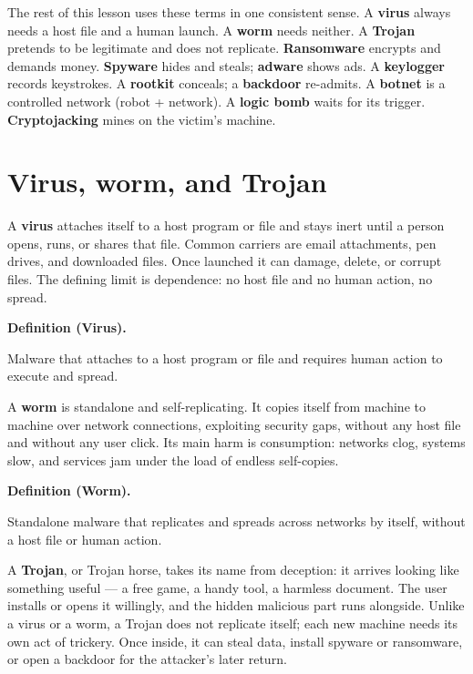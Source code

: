 \documentclass[11pt]{article}
\newenvironment{definitionbox}[1]{%
  \par\noindent\textbf{Definition (#1).}\ \itshape
}{\par\vspace{0.3em}}
\begin{document}
The rest of this lesson uses these terms in one consistent sense. A
\textbf{virus} always needs a host file and a human launch. A \textbf{worm}
needs neither. A \textbf{Trojan} pretends to be legitimate and does not
replicate. \textbf{Ransomware} encrypts and demands money.
\textbf{Spyware} hides and steals; \textbf{adware} shows ads. A
\textbf{keylogger} records keystrokes. A \textbf{rootkit} conceals; a
\textbf{backdoor} re-admits. A \textbf{botnet} is a controlled network (robot
+ network). A \textbf{logic bomb} waits for its trigger.
\textbf{Cryptojacking} mines on the victim's machine.

\section{Virus, worm, and Trojan}
A \textbf{virus} attaches itself to a host program or file and stays inert
until a person opens, runs, or shares that file. Common carriers are email
attachments, pen drives, and downloaded files. Once launched it can damage,
delete, or corrupt files. The defining limit is dependence: no host file
and no human action, no spread.

\begin{definitionbox}{Virus}
Malware that attaches to a host program or file and requires human action
to execute and spread.
\end{definitionbox}

A \textbf{worm} is standalone and self-replicating. It copies itself from
machine to machine over network connections, exploiting security gaps,
without any host file and without any user click. Its main harm is
consumption: networks clog, systems slow, and services jam under the load
of endless self-copies.

\begin{definitionbox}{Worm}
Standalone malware that replicates and spreads across networks by itself,
without a host file or human action.
\end{definitionbox}

A \textbf{Trojan}, or Trojan horse, takes its name from deception: it
arrives looking like something useful --- a free game, a handy tool, a
harmless document. The user installs or opens it willingly, and the hidden
malicious part runs alongside. Unlike a virus or a worm, a Trojan does not
replicate itself; each new machine needs its own act of trickery. Once
inside, it can steal data, install spyware or ransomware, or open a backdoor
for the attacker's later return.
\end{document}
